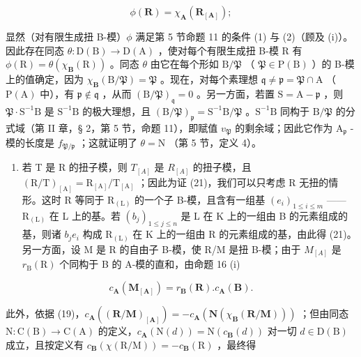 \[
\phi (\mathbf {R}) = \chi_ {\mathbf {A}} (\mathbf {R} _ {[ \mathbf {A} ]});
\]

显然（对有限生成扭 B-模）\(\phi\) 满足第 5 节命题 11 的条件 (1) 与 (2)（顾及 (i)）。因此存在同态 \(\theta: \mathrm{D}(\mathrm{B}) \to \mathrm{D}(\mathrm{A})\) ，使对每个有限生成扭 B-模 R 有 \(\phi(\mathrm{R}) = \theta(\chi_{\mathbf{B}}(\mathrm{R}))\) 。同态 \(\theta\) 由它在每个形如 \(\mathrm{B}/\mathfrak{P}\) （ \(\mathfrak{P} \in \mathrm{P}(\mathrm{B})\) ）的 B-模上的值确定，因为 \(\chi_{\mathbf{B}}(\mathrm{B}/\mathfrak{P}) = \mathfrak{P}\) 。现在，对每个素理想 \(\mathfrak{q} \neq \mathfrak{p} = \mathfrak{P} \cap \mathrm{A}\) （ \(\mathrm{P}(\mathrm{A})\) 中），有 \(\mathfrak{p} \notin \mathfrak{q}\) ，从而 \((\mathrm{B}/\mathfrak{P})_{\mathfrak{q}} = 0\) 。另一方面，若置 \(\mathrm{S} = \mathrm{A} - \mathfrak{p}\) ，则 \(\mathfrak{P} \cdot \mathrm{S}^{-1}\mathrm{B}\) 是 \(\mathrm{S}^{-1}\mathrm{B}\) 的极大理想，且 \((\mathrm{B}/\mathfrak{P})_{\mathfrak{p}} = \mathrm{S}^{-1}\mathrm{B}/\mathfrak{P}\) 。\(\mathrm{S}^{-1}\mathrm{B}\) 同构于 \(\mathrm{B}/\mathfrak{P}\) 的分式域（第 II 章，§ 2，第 5 节，命题 11），即赋值 \(v_{\mathfrak{P}}\) 的剩余域；因此它作为 \(\mathrm{A}_{\mathfrak{p}}\) -模的长度是 \(f_{\mathfrak{P}/\mathfrak{p}}\) ；这就证明了 \(\theta = \mathrm{N}\) （第 5 节，定义 4）。

\begin{enumerate}
\def\labelenumi{(\roman{enumi})}
\setcounter{enumi}{2}
\tightlist
\item
  若 T 是 R 的扭子模，则 \(T_{[A]}\) 是 \(R_{[A]}\) 的扭子模，且 \((\mathrm{R}/\mathrm{T})_{[\mathrm{A}]} = \mathrm{R}_{[\mathrm{A}]}/\mathrm{T}_{[\mathrm{A}]}\) ；因此为证 (21)，我们可以只考虑 R 无扭的情形。这时 R 等同于 \(\mathrm{R}_{(\mathrm{L})}\) 的一个子 B-模，且含有一组基 \((e_{i})_{1 \leqslant i \leqslant m}\) —— \(\mathrm{R}_{(\mathrm{L})}\) 在 L 上的基。若 \((b_{j})_{1 \leqslant j \leqslant n}\) 是 L 在 K 上的一组由 B 的元素组成的基，则诸 \(b_{j}e_{i}\) 构成 \(\mathrm{R}_{(\mathrm{L})}\) 在 K 上的一组由 R 的元素组成的基，由此得 (21)。另一方面，设 M 是 R 的自由子 B-模，使 R/M 是扭 B-模；由于 \(M_{[A]}\) 是 \(r_{\mathrm{B}}(\mathrm{R})\) 个同构于 B 的 A-模的直和，由命题 16 (i)
\end{enumerate}

\[
c _ {\mathbf {A}} (\mathbf {M} _ {[ \mathbf {A} ]}) = r _ {\mathbf {B}} (\mathbf {R}). c _ {\mathbf {A}} (\mathbf {B}).
\]

此外，依据 (19)，\(c_{\mathbf{A}}((\mathbf{R} / \mathbf{M})_{[\mathbf{A}]})=-c_{\mathbf{A}}(\mathbf{N}(\chi_{\mathbf{B}}(\mathbf{R} / \mathbf{M})))\) ；但由同态 \(\mathrm{N}\colon\mathrm{C}(\mathrm{B})\to\mathrm{C}(\mathrm{A})\) 的定义，\(c_{\mathbf{A}}(\mathrm{N}(d))=\mathrm{N}(c_{\mathbf{B}}(d))\) 对一切 \(d\in\mathrm{D}(\mathrm{B})\) 成立，且按定义有 \(c_{\mathbf{B}}(\chi(\mathrm{R}/\mathrm{M}))=-c_{\mathbf{B}}(\mathrm{R})\) ，最终得

